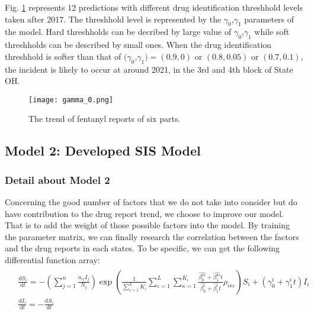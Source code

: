 Fig. \ref{gamma_0} represents 12 predictions with different drug identification threshhold levels taken after 2017. The threshhold level is represented by the $\gamma_0$,$\gamma_1$ parameters of the model. Hard threshholds can be decribed by large value of $\gamma_0$,$\gamma_1$ while soft threshholds can be described by small ones. When the drug identification threshhold is softer than that of $(\gamma_0$,$\gamma_1)=(0.9,0)$ or $(0.8,0.05)$ or $(0.7,0.1)$, the incident is likely to occur at around 2021, in the 3rd and 4th block of State OH.
\begin{figure}[h]
	\centering
	\texttt{[image: gamma\_0.png]}
	\caption{The trend of fentanyl reports of six parts.}
	\label{gamma_0}
\end{figure}

\subsection{Model 2: Developed SIS Model}
\subsubsection{Detail about Model 2}
Concerning the good number of factors that we do not take into consider but do have contribution to the drug report trend, we choose to improve our model. That is to add the weight of those possible factors into the model. By training the parameter matrix, we can finally research the correlation between the factors and the drug reports in each states. To be specific, we can get the following differential function array:
\begin{eqnarray}
\begin{aligned}
&\frac{\text{d}S_i}{\text{d}t}=-\left( \sum_{j=1}^n{\frac{a_{ij}I_j}{N_j}} \right) \exp \left( \frac{1}{\sum_{\iota =1}^L{K_{\iota}}}\sum_{\iota =1}^L{\sum_{\kappa =1}^{K_{\iota}}{\frac{\widehat{\beta _{0}^{\kappa \iota}}+\widehat{\beta _{1}^{\kappa \iota}}t}{\widehat{\beta _{0}^{\iota}}+\widehat{\beta _{1}^{\iota}}t}}\rho _{i\kappa \iota}} \right) S_i+\left( \gamma _{0}^{i}+\gamma _{1}^{i}t \right) I_i
\\
&\frac{\text{d}I_i}{\text{d}t}=-\frac{\text{d}S_i}{\text{d}t}
\end{aligned}\label{modifyfunction}
\end{eqnarray}

